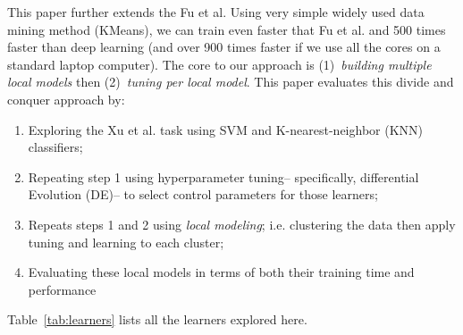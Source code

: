 \documentclass[sigconf]{acmart}
\theoremstyle{break}
\begin{document}
   This paper further extends the Fu et al. Using very simple widely used data mining method (KMeans), we can train even faster that Fu et al. and 
   500 times faster than  deep learning (and over 900 times faster if we use all the cores on a standard laptop computer).
   The core to our approach is  (1)~{\em building multiple local models} then (2)~{\em tuning per local model}.
This paper evaluates this divide and conquer approach by:
    \begin{enumerate}
        \item  Exploring the Xu et al. task using SVM and K-nearest-neighbor (KNN) classifiers;
        \item Repeating step 1 using  hyperparameter tuning--
        specifically,  differential Evolution (DE)--
        to select control parameters for those learners;
        \item Repeats steps 1 and 2 using 
        {\em local modeling};
        i.e. clustering the data then apply tuning and learning to each cluster; 
      
        \item Evaluating these local models in terms of both their training time and performance
    \end{enumerate}
 Table~\ref{tab:learners} lists all the learners explored here.
 
\end{document}
